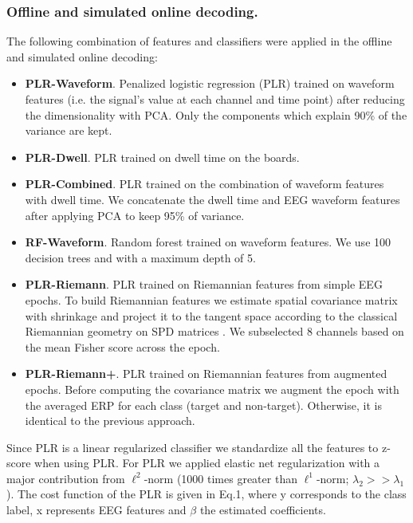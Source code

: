 \documentclass[12pt]{iopart}
\begin{document}
\subsubsection*{Offline and simulated online decoding.}
The following combination of features and classifiers were applied in the offline and simulated online decoding:
\begin{itemize}
    \item \textbf{PLR-Waveform}. Penalized logistic regression (PLR) trained on waveform features (i.e. the signal's
        value at each channel and time point) after reducing
        the dimensionality with PCA. Only the components which explain 90\% of the variance
        are kept. 
    \item \textbf{PLR-Dwell}. PLR trained on dwell time on the boards.
    \item \textbf{PLR-Combined}. PLR trained on the combination of waveform features with dwell time. We concatenate
        the dwell time and EEG waveform features after applying PCA to keep 95\% of variance. 

    \item \textbf{RF-Waveform}. Random forest trained on waveform features. We use 100 decision trees and
        with a maximum depth of 5.
    \item \textbf{PLR-Riemann}. PLR trained on Riemannian features from simple EEG epochs.
        To build Riemannian features we
        estimate spatial covariance matrix with shrinkage and project it
        to the tangent space according to the classical Riemannian geometry on SPD matrices
        \cite{barachant_multiclass_2012}.
        We subselected 8 channels based on the mean Fisher score across the epoch.
    \item \textbf{PLR-Riemann+}. PLR trained on Riemannian features from augmented epochs.
        Before computing the covariance matrix we augment the epoch with the averaged ERP
        for each class (target and non-target). Otherwise, it is identical to the previous
        approach.
\end{itemize}

Since PLR is a linear regularized classifier 
we standardize all the features to z-score when
using PLR. For PLR we applied elastic net regularization
with a major contribution from $\ell^2$-norm (1000 times greater than $\ell^1$-norm; $\lambda_2 >> \lambda_1$). The cost function of the PLR is given in Eq.1, where y corresponds to the class label, x represents EEG features and $\beta$ the estimated coefficients.  
\end{document}

